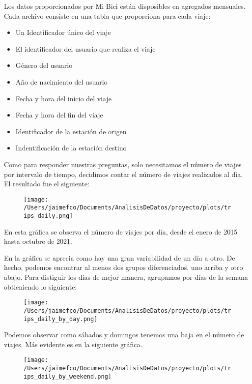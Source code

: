 \documentclass[
]{article}
\begin{document}
Los datos proporcionados por Mi Bici están disposibles en agregados
mensuales. Cada archivo consiste en una tabla que proporciona para cada
viaje:

\begin{itemize}
\item
  Un Identificador único del viaje
\item
  El identificador del usuario que realiza el viaje
\item
  Género del usuario
\item
  Año de nacimiento del usuario
\item
  Fecha y hora del inicio del viaje
\item
  Fecha y hora del fin del viaje
\item
  Identificador de la estación de origen
\item
  Indentificación de la estación destino
\end{itemize}

Como para responder nuestras preguntas, solo necesitamos el número de
viajes por intervalo de tiempo, decidimos contar el número de viajes
realizados al día. El resultado fue el siguiente:

\begin{figure}
\centering
\texttt{[image: /Users/jaimefco/Documents/AnalisisDeDatos/proyecto/plots/trips\_daily.png]}
\caption{}
\end{figure}

En esta gráfica se observa el número de viajes por día, desde el enero
de 2015 hasta octubre de 2021.

En la gráfica se aprecia como hay una gran variabilidad de un día a
otro. De hecho, podemos encontrar al menos dos grupos diferenciados, uno
arriba y otro abajo. Para distiguir los días de mejor manera, agrupamos
por días de la semana obtieniendo lo siguiente:

\begin{figure}
\centering
\texttt{[image: /Users/jaimefco/Documents/AnalisisDeDatos/proyecto/plots/trips\_daily\_by\_day.png]}
\caption{}
\end{figure}

Podemos observar como sábados y domingos tenemos una baja en el número
de viajes. Más evidente es en la siguiente gráfica.

\begin{figure}
\centering
\texttt{[image: /Users/jaimefco/Documents/AnalisisDeDatos/proyecto/plots/trips\_daily\_by\_weekend.png]}
\caption{}
\end{figure}
\end{document}

